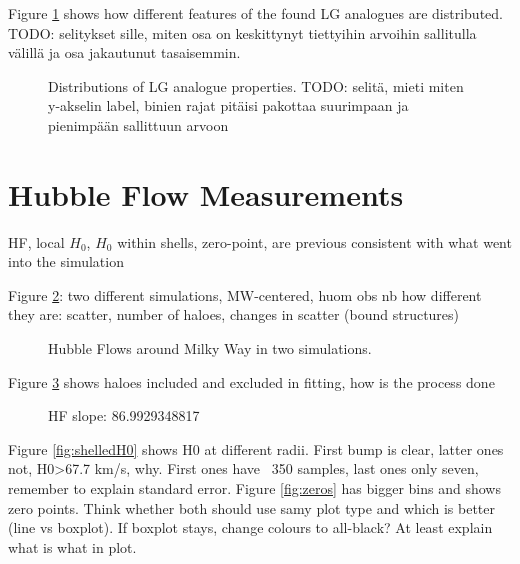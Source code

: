 \documentclass[english, oneside]{HYgradu}
\begin{document}
\reversemarginpar
{}
Figure \ref{fig:LGproperties} shows how different features of the found LG analogues are distributed. TODO: selitykset sille, miten osa on keskittynyt tiettyihin arvoihin sallitulla välillä ja osa jakautunut tasaisemmin. 

\begin{figure}
    \centering
    
    \caption{Distributions of LG analogue properties. TODO: selitä, mieti miten y-akselin label, binien rajat pitäisi pakottaa suurimpaan ja pienimpään sallittuun arvoon}\label{fig:LGproperties}
\end{figure}


\section{Hubble Flow Measurements}
HF, local $H_0$, $H_0$ within shells, zero-point, are previous consistent with what went into the simulation

Figure \ref{fig:hubblediagrams}: two different simulations, MW-centered, huom obs nb how different they are: scatter, number of haloes, changes in scatter (bound structures)

\begin{figure}
    \centering
    
    \caption{Hubble Flows around Milky Way in two simulations.}\label{fig:hubblediagrams}
\end{figure}

Figure \ref{fig:hubblefit} shows haloes included and excluded in fitting, how is the process done

\begin{figure}
    \centering
    
    \caption{HF slope: 86.9929348817}\label{fig:hubblefit}
\end{figure}

Figure \ref{fig:shelledH0} shows H0 at different radii. First bump is clear, latter ones not, H0>67.7 km/s, why. First ones have ~350 samples, last ones only seven, remember to explain standard error. Figure \ref{fig:zeros} has bigger bins and shows zero points. Think whether both should use samy plot type and which is better (line vs boxplot). If boxplot stays, change colours to all-black? At least explain what is what in plot.
\end{document}
